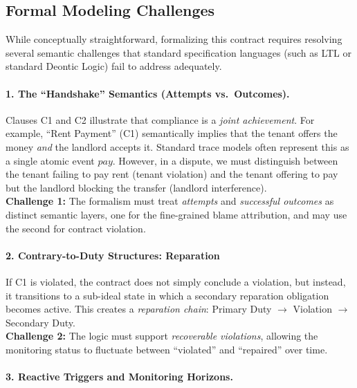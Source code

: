 \subsection{Formal Modeling Challenges}

\label{subsec:formal-challenges}



While conceptually straightforward, formalizing this contract requires resolving several semantic challenges that standard specification languages (such as LTL or standard Deontic Logic) fail to address adequately.



\paragraph{1. The ``Handshake'' Semantics (Attempts vs.\ Outcomes).}

Clauses C1 and C2 illustrate that compliance is a \emph{joint achievement}. For example, ``Rent Payment'' (C1) semantically implies that the tenant offers the money \emph{and} the landlord accepts it. Standard trace models often represent this as a single atomic event $pay$. However, in a dispute, we must distinguish between the tenant failing to pay rent (tenant violation) and the tenant offering to pay but the landlord blocking the transfer (landlord interference).\\

\textbf{Challenge 1:} The formalism must treat \emph{attempts} and \emph{successful outcomes} as distinct semantic layers, one for the fine-grained blame attribution, and may use the second for contract violation.

\paragraph{2. Contrary-to-Duty Structures: Reparation}

If C1 is violated, the contract does not simply conclude a violation, but instead, it transitions to a sub-ideal state in which a secondary reparation obligation becomes active. This creates a \emph{reparation chain}: Primary Duty $\to$ Violation $\to$ Secondary Duty.\\

\textbf{Challenge 2:} The logic must support \emph{recoverable violations}, allowing the monitoring status to fluctuate between ``violated'' and ``repaired'' over time.



\paragraph{3. Reactive Triggers and Monitoring Horizons.}

